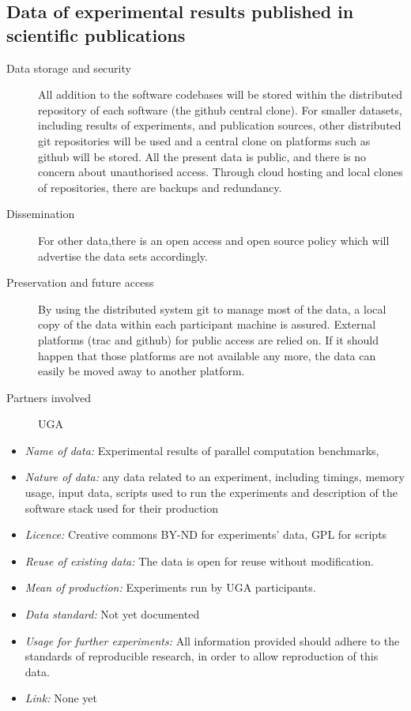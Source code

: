 \documentclass{deliverablereport}
\begin{document}
\begin{enumerate}
\subsection{Data of experimental results published in scientific publications}

\begin{description}
\item[Data storage and security] All addition to the software codebases will be stored within the distributed repository of each software (the github central clone). For smaller datasets, including results of experiments, and publication sources, other distributed git repositories will be used and a central clone on platforms such as github will be stored. All the present data is public, and there is no concern about unauthorised access. Through cloud hosting and local clones of repositories, there are backups and redundancy.
\item[Dissemination] For other data,there is an open access and open source policy which will advertise the data sets accordingly.
\item[Preservation and future access] By using the distributed system git to manage most of the data, a local copy of the data within each participant machine is assured. External platforms (trac and github) for public access are relied on. If it should happen that those platforms are not available any more, the data can easily be moved away to another platform.
\item[Partners involved] UGA
\end{description}

\begin{itemize}
\item\textit{Name of data:} Experimental results of parallel computation benchmarks,
\item\textit{Nature of data:} any data related to an experiment, including timings,
  memory usage, input data, scripts used to run the experiments and description
  of the software stack used for their production
\item\textit{Licence:} Creative commons BY-ND for experiments' data, GPL for scripts
\item\textit{Reuse of existing data:} The data is open for reuse without modification.
\item\textit{Mean of production:} Experiments run by UGA participants.
\item\textit{Data standard:} Not yet documented
\item\textit{Usage for further experiments:} All information provided should adhere to
  the standards of reproducible research, in order to allow reproduction of
  this data.
\item\textit{Link:} None yet
\end{itemize}




\end{enumerate}
\end{document}
